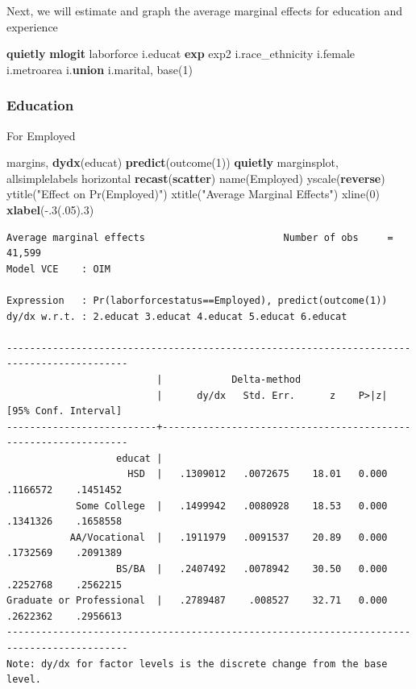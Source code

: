 \documentclass[
]{book}
\newenvironment{Shaded}{\begin{snugshade}}{\end{snugshade}}
\newcommand{\BaseNTok}[1]{\textcolor[rgb]{0.00,0.00,0.81}{#1}}
\newcommand{\FunctionTok}[1]{\textcolor[rgb]{0.13,0.29,0.53}{\textbf{#1}}}
\newcommand{\KeywordTok}[1]{\textcolor[rgb]{0.13,0.29,0.53}{\textbf{#1}}}
\newcommand{\NormalTok}[1]{#1}
\newcommand{\StringTok}[1]{\textcolor[rgb]{0.31,0.60,0.02}{#1}}
\begin{document}
Next, we will estimate and graph the average marginal effects for education and experience

\begin{Shaded}
\begin{Highlighting}[]
\KeywordTok{quietly} \KeywordTok{mlogit}\NormalTok{ laborforce i.educat }\FunctionTok{exp}\NormalTok{ exp2 i.race\_ethnicity i.female i.metroarea i.}\KeywordTok{union}\NormalTok{ i.marital, base(1)}
\end{Highlighting}
\end{Shaded}

\subsubsection*{Education}\label{education}

For Employed

\begin{Shaded}
\begin{Highlighting}[]
\NormalTok{margins, }\KeywordTok{dydx}\NormalTok{(educat) }\KeywordTok{predict}\NormalTok{(outcome(1))}
\KeywordTok{quietly}\NormalTok{ marginsplot, allsimplelabels horizontal }\KeywordTok{recast}\NormalTok{(}\KeywordTok{scatter}\NormalTok{) }\BaseNTok{name}\NormalTok{(Employed) }\BaseNTok{yscale}\NormalTok{(}\FunctionTok{reverse}\NormalTok{) }\BaseNTok{ytitle}\NormalTok{(}\StringTok{"Effect on Pr(Employed)"}\NormalTok{) }\BaseNTok{xtitle}\NormalTok{(}\StringTok{"Average Marginal Effects"}\NormalTok{) }\BaseNTok{xline}\NormalTok{(0) }\KeywordTok{xlabel}\NormalTok{({-}.3(.05).3)}
\end{Highlighting}
\end{Shaded}

\begin{verbatim}
Average marginal effects                        Number of obs     =     41,599
Model VCE    : OIM

Expression   : Pr(laborforcestatus==Employed), predict(outcome(1))
dy/dx w.r.t. : 2.educat 3.educat 4.educat 5.educat 6.educat

-------------------------------------------------------------------------------------------
                          |            Delta-method
                          |      dy/dx   Std. Err.      z    P>|z|     [95% Conf. Interval]
--------------------------+----------------------------------------------------------------
                   educat |
                     HSD  |   .1309012   .0072675    18.01   0.000     .1166572    .1451452
            Some College  |   .1499942   .0080928    18.53   0.000     .1341326    .1658558
           AA/Vocational  |   .1911979   .0091537    20.89   0.000     .1732569    .2091389
                   BS/BA  |   .2407492   .0078942    30.50   0.000     .2252768    .2562215
Graduate or Professional  |   .2789487    .008527    32.71   0.000     .2622362    .2956613
-------------------------------------------------------------------------------------------
Note: dy/dx for factor levels is the discrete change from the base level.
\end{verbatim}
\end{document}
